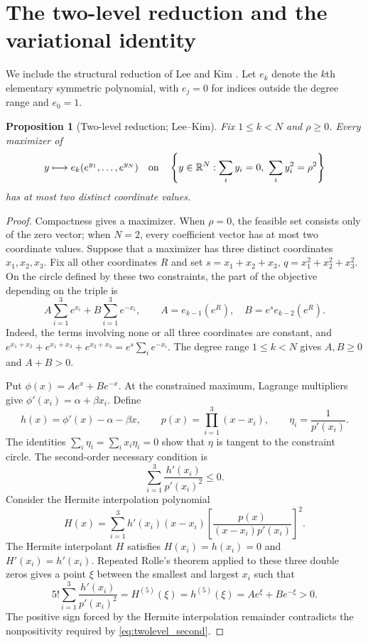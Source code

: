 \documentclass[11pt,a4paper]{article}
\newtheorem{proposition}[theorem]{Proposition}
\begin{document}
\section{The two-level reduction and the variational identity}\label{sec:exchangeable}
We include the structural reduction of Lee and Kim \cite[Proposition 2 and Remark 1]{LeeKim}. Let $e_k$ denote the $k$th elementary symmetric polynomial, with $e_j=0$ for indices outside the degree range and $e_0=1$.

\begin{proposition}[Two-level reduction; Lee--Kim]\label{prop:two_level}
Fix $1\le k<N$ and $\rho\ge0$. Every maximizer of
\[
 y\longmapsto e_k(e^{y_1},\ldots,e^{y_N})
 \quad\text{on}\quad
 \left\{y\in\mathbb R^N:\sum_i y_i=0,\ \sum_i y_i^2=\rho^2\right\}
\]
has at most two distinct coordinate values.
\end{proposition}
\begin{proof}
Compactness gives a maximizer. When $\rho=0$, the feasible set consists only of the zero vector; when $N=2$, every coefficient vector has at most two coordinate values. Suppose that a maximizer has three distinct coordinates $x_1,x_2,x_3$. Fix all other coordinates $R$ and set $s=x_1+x_2+x_3$, $q=x_1^2+x_2^2+x_3^2$. On the circle defined by these two constraints, the part of the objective depending on the triple is
\[
 A\sum_{i=1}^3e^{x_i}+B\sum_{i=1}^3e^{-x_i},
 \qquad A=e_{k-1}(e^R),\quad B=e^s e_{k-2}(e^R).
\]
Indeed, the terms involving none or all three coordinates are constant, and $e^{x_1+x_2}+e^{x_1+x_3}+e^{x_2+x_3}=e^s\sum_i e^{-x_i}$. The degree range $1\le k<N$ gives $A,B\ge0$ and $A+B>0$.

Put $\phi(x)=Ae^x+Be^{-x}$. At the constrained maximum, Lagrange multipliers give $\phi'(x_i)=\alpha+\beta x_i$. Define
\[
 h(x)=\phi'(x)-\alpha-\beta x,\qquad p(x)=\prod_{i=1}^3(x-x_i),\qquad
 \eta_i=\frac1{p'(x_i)}.
\]
The identities $\sum_i\eta_i=\sum_i x_i\eta_i=0$ show that $\eta$ is tangent to the constraint circle. The second-order necessary condition is
\begin{equation}\label{eq:twolevel_second}
 \sum_{i=1}^3\frac{h'(x_i)}{p'(x_i)^2}\le0.
\end{equation}
Consider the Hermite interpolation polynomial
\[
 H(x)=\sum_{i=1}^3h'(x_i)(x-x_i)
 \left[\frac{p(x)}{(x-x_i)p'(x_i)}\right]^2.
\]
The Hermite interpolant $H$ satisfies $H(x_i)=h(x_i)=0$ and $H'(x_i)=h'(x_i)$. Repeated Rolle's theorem applied to these three double zeros gives a point $\xi$ between the smallest and largest $x_i$ such that
\[
 5!\sum_{i=1}^3\frac{h'(x_i)}{p'(x_i)^2}
 =H^{(5)}(\xi)=h^{(5)}(\xi)=Ae^\xi+Be^{-\xi}>0.
\]
The positive sign forced by the Hermite interpolation remainder contradicts the nonpositivity required by \eqref{eq:twolevel_second}.
\end{proof}
\end{document}
